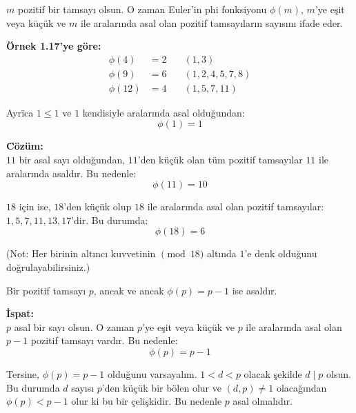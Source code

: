 \begin{tcolorbox}[colback=blue!5, colframe=blue!40!black, title=Tanım, fonttitle=\bfseries, sharp corners, boxrule=0.6pt]
$m$ pozitif bir tamsayı olsun. O zaman Euler'in phi fonksiyonu $\phi(m)$, $m$'ye eşit veya küçük ve $m$ ile aralarında asal olan pozitif tamsayıların sayısını ifade eder.
\end{tcolorbox}

\vspace{1em}

\noindent \textbf{\"Ornek 1.17'ye g\"ore:}
\begin{align*}
\phi(4) &= 2 \quad & (1, 3) \\
\phi(9) &= 6 \quad & (1, 2, 4, 5, 7, 8) \\
\phi(12) &= 4 \quad & (1, 5, 7, 11)
\end{align*}

\vspace{1em}

\noindent Ayr\"ica $1 \leq 1$ ve $1$ kendisiyle aralarında asal olduğundan:
\[
\phi(1) = 1
\]

\vspace{2em}

\begin{tcolorbox}[colback=gray!10, colframe=black, title=\textbf{\"Ornek 1.18: $\phi(11)$ ve $\phi(18)$ Hesaplama}, fonttitle=\bfseries, sharp corners]
\textbf{\"C\"oz\"um:}\\
$11$ bir asal sayı olduğundan, $11$'den küçük olan t\"um pozitif tamsayılar $11$ ile aralarında asaldır. Bu nedenle:
\[
\phi(11) = 10
\]

$18$ için ise, $18$'den küçük olup $18$ ile aralarında asal olan pozitif tamsayılar: $1, 5, 7, 11, 13, 17$'dir. Bu durumda:
\[
\phi(18) = 6
\]

(Not: Her birinin altıncı kuvvetinin $\pmod{18}$ altında $1$'e denk olduğunu doğrulayabilirsiniz.)
\end{tcolorbox}

\vspace{2em}

\begin{tcolorbox}[colback=yellow!5, colframe=orange!50!black, title=\textbf{Lemma 1.5: Asal Sayılar ve $\phi$ Fonksiyonu}, fonttitle=\bfseries, sharp corners]
Bir pozitif tamsayı $p$, ancak ve ancak $\phi(p) = p - 1$ ise asaldır.

\textbf{İspat:}\\
$p$ asal bir sayı olsun. O zaman $p$'ye eşit veya küçük ve $p$ ile aralarında asal olan $p - 1$ pozitif tamsayı vardır. Bu nedenle:
\[
\phi(p) = p - 1
\]

Tersine, $\phi(p) = p - 1$ olduğunu varsayalım. $1 < d < p$ olacak şekilde $d \mid p$ olsun. Bu durumda $d$ sayısı $p$'den küçük bir bölen olur ve $(d, p) \ne 1$ olacağından $\phi(p) < p - 1$ olur ki bu bir çelişkidir. Bu nedenle $p$ asal olmalıdır.
\end{tcolorbox}

